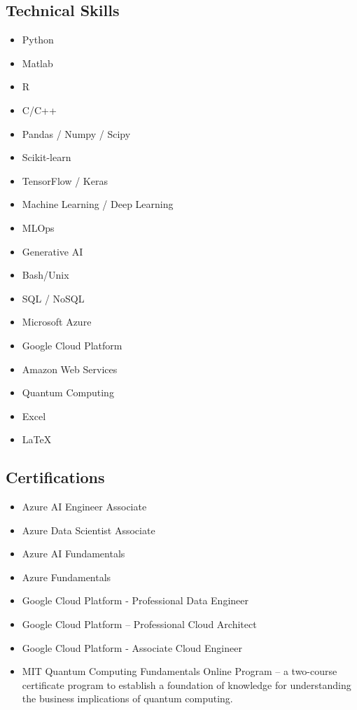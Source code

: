 \documentclass[10pt,a4paper,sans]{moderncv}        %
\begin{document}
\subsection{Technical Skills}
\vspace{-1.25em}
\begin{multicols}{2}
\begin{itemize}
\item Python  \hfill {}
\item Matlab  \hfill {}
\item R  \hfill {}
\item C/C++  \hfill {}
\item Pandas / Numpy / Scipy \hfill {}
\item Scikit-learn \hfill {}
\item TensorFlow / Keras \hfill {}
\item Machine Learning / Deep Learning \hfill {}
\item MLOps \hfill {}
\item Generative AI \hfill {}
\item Bash/Unix \hfill {}
\item SQL / NoSQL \hfill {}
\item Microsoft Azure \hfill {}
\item Google Cloud Platform \hfill {}
\item Amazon Web Services \hfill {}
\item Quantum Computing  \hfill {}
\item Excel \hfill {}
\item \LaTeX \hfill {}
\end{itemize}
\end{multicols}

\subsection{Certifications}
\begin{itemize}
\item Azure AI Engineer Associate
\item Azure Data Scientist Associate
\item Azure AI Fundamentals
\item Azure Fundamentals
\item Google Cloud Platform - Professional Data Engineer 
\item Google Cloud Platform – Professional Cloud Architect  
\item Google Cloud Platform - Associate Cloud Engineer 
\item MIT Quantum Computing Fundamentals Online Program – a two-course certificate program to establish a foundation of knowledge for understanding the business implications of quantum computing. 
\end{itemize}
\end{document}
